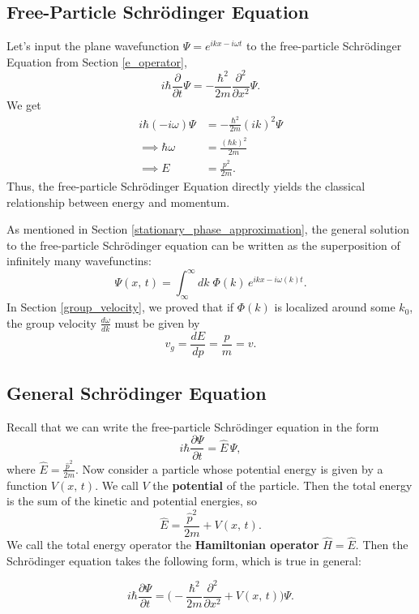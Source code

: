 \subsection{Free-Particle Schrödinger Equation}\label{free_particle_schrodinger}

Let's input the plane wavefunction $\Psi=e^{ikx-i\omega t}$ to the free-particle Schrödinger Equation from Section \ref{e_operator}, $$i\hbar\frac{\partial}{\partial t}\Psi=-\frac{\hbar^2}{2m}\frac{\partial^2}{\partial x^2}\Psi.$$We get \begin{align*}
i\hbar(-i\omega)\Psi&=-\frac{\hbar^2}{2m}(ik)^2\Psi \\
\implies\hbar\omega&=\frac{(\hbar k)^2}{2m}\\
 \implies E&=\frac{p^2}{2m}.
\end{align*}
Thus, the free-particle Schrödinger Equation directly yields the classical relationship between energy and momentum. 

As mentioned in Section \ref{stationary_phase_approximation}, the general solution to the free-particle Schrödinger equation can be written as the superposition of infinitely many wavefunctins: $$\Psi(x,\,t)=\int_{\infty}^{\infty}dk\;\Phi(k)\,e^{ikx-i\omega(k)t}.$$In Section \ref{group_velocity}, we proved that if $\Phi(k)$ is localized around some $k_0$, the group velocity $\frac{d\omega}{dk}$ must be given by $$v_g=\frac{dE}{dp}=\frac{p}{m}=v.$$

\subsection{General Schrödinger Equation}
\label{general_schrodinger}

Recall that we can write the free-particle Schrödinger equation in the form $$i\hbar \frac{\partial\Psi}{\partial t}=\hat{E}\,\Psi,$$where $\hat{E}=\frac{\hat{p}^2}{2m}$.
Now consider a particle whose potential energy is given by a function $V(x,\,t)$. We call $V$ the \textbf{potential} of the particle. Then the total energy is the sum of the kinetic and potential energies, so $$\hat{E}=\frac{\hat{p}^2}{2m}+V(x,\,t).$$We call the total energy operator the \textbf{Hamiltonian operator} $\hat{H}=\hat{E}$. Then the Schrödinger equation takes the following form, which is true in general: 

\begin{framedthm}\label{general_schrodinger_eqn}
    $$i\hbar\frac{\partial\Psi}{\partial t}=\bigg(-\frac{\hbar^2}{2m}\frac{\partial^2}{\partial x^2}+V(x,\,t)\bigg)\Psi.$$
\end{framedthm}

